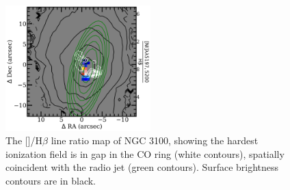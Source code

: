 		\begin{figure}
			\centering
			\includegraphics[width=0.5\textwidth]{chapter5/vimos/ngc3100_NI_Hb.png}
			\caption[NGC 3100 /H$\beta$ line ratio map]{The []/H$\beta$ line ratio map of NGC 3100, showing the hardest ionization field is in gap in the CO ring (white contours), spatially coincident with the radio jet (green contours). Surface brightness contours are in black.}
			\label{fig:ngc3100_NI_Hb}
		\end{figure}
 
